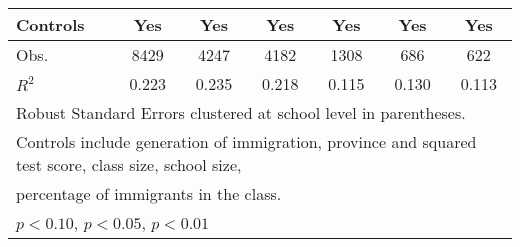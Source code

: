 \begin{table}[htbp]
\begin{tabular}{l*{6}{c}}
Controls            &         Yes         &         Yes         &         Yes         &         Yes         &         Yes         &         Yes         \\
\midrule
Obs.                &        8429         &        4247         &        4182         &        1308         &         686         &         622         \\
\(R^{2}\)           &       0.223         &       0.235         &       0.218         &       0.115         &       0.130         &       0.113         \\
\bottomrule
\multicolumn{7}{l}{\footnotesize Robust Standard Errors clustered at school level in parentheses.}\\
\multicolumn{7}{l}{\footnotesize Controls include generation of immigration, province and squared test score, class size, school size,}\\
\multicolumn{7}{l}{\footnotesize percentage of immigrants in the class.}\\
\multicolumn{7}{l}{\footnotesize \sym{*} \(p<0.10\), \sym{**} \(p<0.05\), \sym{***} \(p<0.01\)}\\
\end{tabular}
\end{table}
